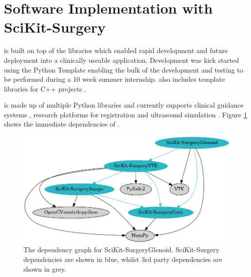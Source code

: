 \section{Software Implementation with SciKit-Surgery}
\sksglenoid is built on top of the \sksurgery \cite{PMID:32436132} libraries which enabled
rapid development and future deployment into a clinically useable application. 
Development was kick started using the \sksurgery Python Template \cite{doel_tom_2022_5879146} enabling the bulk of the development and testing to be performed during a 10 week summer internship. \sksurgery also includes template libraries for C++ projects \cite{dowrick2021cmakecatchtemplate}.

\sksurgery is made up of multiple Python libraries and currently supports clinical 
guidance systems \cite{schneider2020comparison}, research platforms for registration \cite{thompson2021fiducial} and ultrasound simulation \cite{thompson2020snappysonic}. 
Figure \ref{fig:deps} shows the immediate dependencies of \sksglenoidns. 

\begin{figure}
	\begin{center}
		\includegraphics[width=0.6\linewidth]{figures/dep_graph.png}
			\caption{\label{fig:deps}The dependency graph for SciKit-SurgeryGlenoid. SciKit-Surgery dependencies are shown in blue, whilst 3rd party dependencies are shown in grey.}
	\end{center}
\end{figure}

